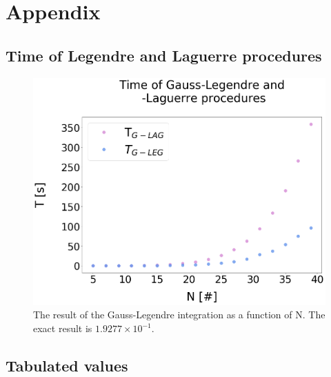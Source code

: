 \documentclass[%
reprint,
amsmath,amssymb,
aps,
]{revtex4-1}
\begin{document}
\section{Appendix}
\subsection{Time of Legendre and Laguerre procedures }
\begin{figure}[!h]
	\includegraphics[scale = 0.3]{Gauss_time.png}
	\caption{\label{integrated_time} The result of the Gauss-Legendre integration as a function of N. The exact result is $1.9277\times 10^{-1}$. }
\end{figure}

\subsection{Tabulated values}
\end{document}
